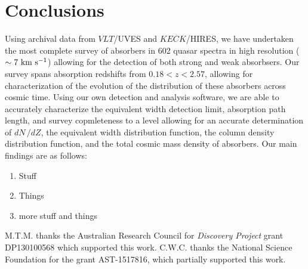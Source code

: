 \documentclass[linenumbers,twocolumn]{aastex61}
\begin{document}
\section{Conclusions}
\label{sec:conclusions}

Using archival data from $VLT$/UVES and $KECK$/HIRES, we have undertaken the most complete survey of {\CIV} absorbers in 602 quasar spectra in high resolution ($\sim 7~\mathrm{\hbox{km~s$^{-1}$}}$) allowing for the detection of both strong and weak {\CIV} absorbsers. Our survey spans absorption redshifts from $0.18 < z < 2.57$, allowing for characterization of the evolution of the distribution of these absorbers across cosmic time. Using our own detection and analysis software, we are able to accurately characterize the equivalent width detection limit, absorption path length, and survey copmleteness to a level allowing for an accurate determination of $dN\,/dZ$, the equivalent width distribution function, the column density distribution function, and the total cosmic mass density of {\CIV} absorbers. Our main findings are as follows:

\begin{enumerate}
\item Stuff
\item Things
\item more stuff and things
\end{enumerate}

M.T.M. thanks the Australian Research Council for \textsl{Discovery Project} grant DP130100568 which supported this work. C.W.C. thanks the National Science Foundation for the grant AST-1517816, which partially supported this work.



\end{document}
